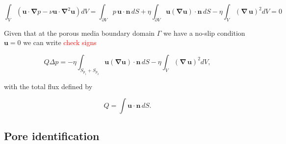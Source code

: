 \documentclass[draft]{agujournal2019}
\newcommand{\markred}[1]{\textcolor{red}{#1}}
\begin{document}
\begin{equation}\label{eq:stokes_dissipation}
\int_V \left(\mathbf{u}\cdot\mathbf{\nabla} p-\nu \mathbf{u}\cdot\mathbf{\nabla}^2 \mathbf{u}\right) dV 
= \int_{\partial V}  p\,\mathbf{u}\cdot\mathbf{n}\,dS+\eta \int_{\partial V} \mathbf{u} (\mathbf{\nabla} \mathbf{u})\cdot\mathbf{n}\,dS-\eta \int_{V} (\mathbf{\nabla}\, \mathbf{u})^2 dV=0
\end{equation}

Given that at the porous media boundary domain $\Gamma$ we have a no-slip condition $\mathbf{u}=0$ we can write \markred{check signs}

\begin{equation}\label{eq:pressuredrop}
	Q \Delta p = -\eta\int_{S_{p_1}+S_{p_2}} \mathbf{u} (\mathbf{\nabla} \mathbf{u})\cdot\mathbf{n}\,dS -\eta \int_V (\mathbf{\nabla}\, \mathbf{u})^2 dV,
\end{equation}


with the total flux defined by 

\begin{equation}
	Q=\int \mathbf{u}\cdot\mathbf{n}\, dS.
\end{equation}




\subsection{Pore identification}
\end{document}
